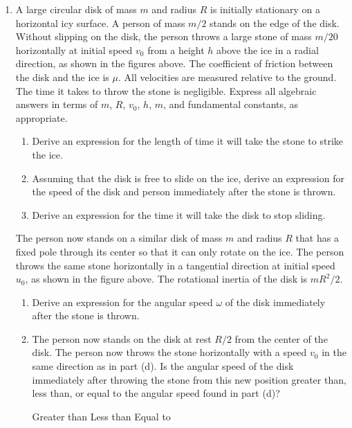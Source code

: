 \documentclass{../../../oss-apphys}
\begin{document}
\begin{enumerate}
\item A large circular disk of mass $m$ and radius $R$ is initially stationary
  on a horizontal icy surface. A person of mass $m/2$ stands on the edge of the
  disk. Without slipping on the disk, the person throws a large stone of mass
  $m/20$ horizontally at initial speed $v_0$ from a height $h$ above the ice in
  a radial direction, as shown in the figures above. The coefficient of
  friction between the disk and the ice is $\mu$. All velocities are measured
  relative to the ground. The time it takes to throw the stone is negligible.
  Express all algebraic answers in terms of $m$, $R$, $v_0$, $h$, $m$, and
  fundamental constants, as appropriate.
  \begin{enumerate}
  \item Derive an expression for the length of time it will take the stone to
    strike the ice.
  \item Assuming that the disk is free to slide on the ice, derive an
    expression for the speed of the disk and person immediately after the stone
    is thrown.
  \item Derive an expression for the time it will take the disk to stop sliding.
  \end{enumerate}
  \begin{center}
  \end{center}
  The person now stands on a similar disk of mass $m$ and radius $R$ that has a
  fixed pole through its center so that it can only rotate on the ice. The
  person throws the same stone horizontally in a tangential direction at
  initial speed $u_0$, as shown in the figure above. The rotational inertia of
  the disk is $mR^2/2$.
  \begin{enumerate}[resume]
  \item Derive an expression for the angular speed $\omega$ of the disk
    immediately after the stone is thrown.
  \item The person now stands on the disk at rest $R/2$ from the center of the
    disk. The person now throws the stone horizontally with a speed $v_0$ in
    the same direction as in part (d). Is the angular speed of the disk
    immediately after throwing the stone from this new position greater than,
    less than, or equal to the angular speed found in part (d)?

    \vspace{.1in}
    \underline{\hspace{.3in}} Greater than\hspace{.2in}
    \underline{\hspace{.3in}} Less than\hspace{.2in}
    \underline{\hspace{.3in}} Equal to
    

\end{enumerate}
\end{enumerate}
\end{document}
